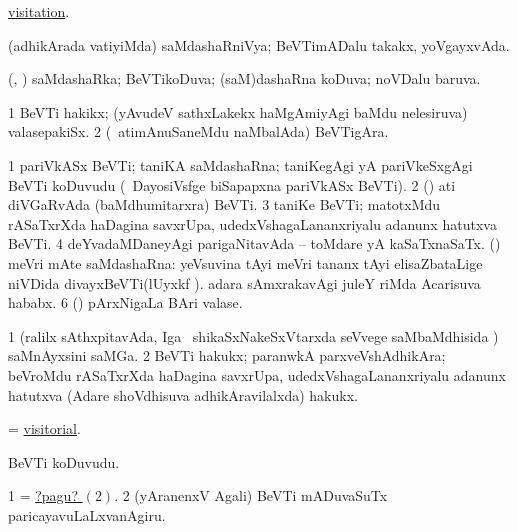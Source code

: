 \noindent 
\gl{\pagu}
\expl{}
\bmng
  \hyperlink{visitation pagu(2)}{visitation}. 
\emng
\eentry

\bentry
{} 
\gl{\gu} 
\bmng
 (adhikArada vatiyiMda) saMdashaRniVya; BeVTimADalu takakx, yoVgayxvAda. 
\emng
\eentry

\bentry
{} 
\gl{\gu}
\expl{}
\bmng
 (\pArxparx, \kAparx) saMdashaRka; BeVTikoDuva; (saM)dashaRna koDuva; noVDalu baruva. 
\emng
\eentry

\bentry 
{} 
\gl{\nA}
\expl{}
\bmng
\bnum
\num{1} BeVTi hakikx; (yAvudeV sathxLakekx haMgAmiyAgi baMdu nelesiruva) valasepakiSx. 
\num{2} (\kanmu\ atimAnuSaneMdu naMbalAda) BeVTigAra. 
\enum
\emng
\eentry

\bentry
{} 
\gl{\nA}
\expl{}
\bmng
\bnum
\num{1} pariVkASx BeVTi; taniKA saMdashaRna; taniKegAgi yA pariVkeSxgAgi BeVTi koDuvudu (\kanmu\ DayosiVsfge biSapapxna pariVkASx BeVTi). 
\num{2} (\AmA) ati diVGaRvAda (baMdhumitarxra) BeVTi. 
\num{3} taniKe BeVTi; matotxMdu rASaTxrXda haDagina savxrUpa, udedxVshagaLananxriyalu adanunx hatutxva BeVTi. 
\num{4} deYvadaMDaneyAgi parigaNitavAda -- toMdare yA kaSaTxnaSaTx. 
 () meVri mAte saMdashaRna: 
\banum
{} yeVsuvina tAyi meVri tananx tAyi elisaZbataLige niVDida divayxBeVTi(lUyxkf ). 
 adara sAmxrakavAgi juleY riMda Acarisuva hababx. 
\eanum
\numie
\num{6} (\pArxvi) pArxNigaLa BAri valase. 
\enum
\emng

\noindent 
\gl{\pagu}
\expl{}
\bmng
\bnum
\num{1}  (ralilx sAthxpitavAda, Iga \kanmu\ shikaSxNakeSxVtarxda seVvege saMbaMdhisida \roVkAyx) saMnAyxsini saMGa. 
\hypertarget{visitation pagu(2)}{} 
\num{2}  BeVTi hakukx; paranwkA parxveVshAdhikAra; beVroMdu rASaTxrXda haDagina savxrUpa, udedxVshagaLananxriyalu adanunx hatutxva (Adare shoVdhisuva adhikAravilalxda) hakukx. 
\enum
\emng
\eentry

\bentry 
{} 
\gl{\gu}
\expl{}
\bmng
 = \hyperlink{visitorial}{visitorial}. 
\emng
\eentry

\bentry
{} 
\gl{\nA}
\expl{}
\bmng
BeVTi koDuvudu. 
\emng

\noindent
\gl{\pagu}
\bmng
\bnum
\num{1}  = \hyperlink{visiting pagu2}{?pagu? \((2)\)}. 
\hypertarget{visiting pagu2}{} 
\num{2} (yAranenxV Agali) BeVTi mADuvaSuTx paricayavuLaLxvanAgiru. 
\enum
\emng
\eentry

